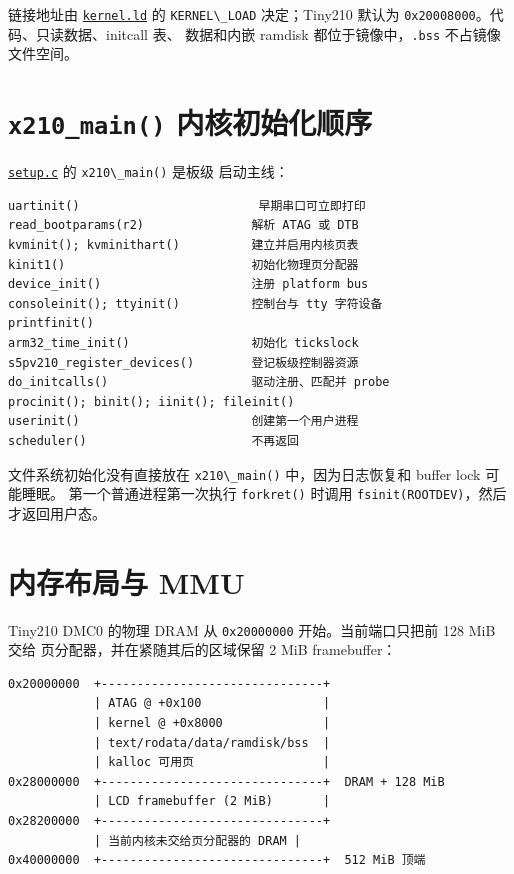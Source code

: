 链接地址由
\href{../../../kernel/arch/arm/mach-s5pv210/kernel.ld}{\passthrough{\lstinline!kernel.ld!}}
的 \passthrough{\lstinline!KERNEL\_LOAD!} 决定；Tiny210 默认为
\passthrough{\lstinline!0x20008000!}。代码、只读数据、initcall 表、
数据和内嵌 ramdisk 都位于镜像中，\passthrough{\lstinline!.bss!}
不占镜像文件空间。

\section{\texorpdfstring{\texttt{x210\_main()}
内核初始化顺序}{x210\_main() 内核初始化顺序}}\label{x210_main-ux5185ux6838ux521dux59cbux5316ux987aux5e8f}

\href{../../../kernel/arch/arm/mach-s5pv210/setup.c}{\passthrough{\lstinline!setup.c!}}
的 \passthrough{\lstinline!x210\_main()!} 是板级 启动主线：

\begin{lstlisting}
uartinit()                         早期串口可立即打印
read_bootparams(r2)               解析 ATAG 或 DTB
kvminit(); kvminithart()          建立并启用内核页表
kinit1()                          初始化物理页分配器
device_init()                     注册 platform bus
consoleinit(); ttyinit()          控制台与 tty 字符设备
printfinit()
arm32_time_init()                 初始化 tickslock
s5pv210_register_devices()        登记板级控制器资源
do_initcalls()                    驱动注册、匹配并 probe
procinit(); binit(); iinit(); fileinit()
userinit()                        创建第一个用户进程
scheduler()                       不再返回
\end{lstlisting}

文件系统初始化没有直接放在 \passthrough{\lstinline!x210\_main()!}
中，因为日志恢复和 buffer lock 可能睡眠。 第一个普通进程第一次执行
\passthrough{\lstinline!forkret()!} 时调用
\passthrough{\lstinline!fsinit(ROOTDEV)!}，然后才返回用户态。

\section{内存布局与 MMU}\label{ux5185ux5b58ux5e03ux5c40ux4e0e-mmu}

Tiny210 DMC0 的物理 DRAM 从 \passthrough{\lstinline!0x20000000!}
开始。当前端口只把前 128 MiB 交给 页分配器，并在紧随其后的区域保留 2 MiB
framebuffer：

\begin{lstlisting}
0x20000000  +-------------------------------+
            | ATAG @ +0x100                 |
            | kernel @ +0x8000              |
            | text/rodata/data/ramdisk/bss  |
            | kalloc 可用页                  |
0x28000000  +-------------------------------+  DRAM + 128 MiB
            | LCD framebuffer (2 MiB)       |
0x28200000  +-------------------------------+
            | 当前内核未交给页分配器的 DRAM |
0x40000000  +-------------------------------+  512 MiB 顶端
\end{lstlisting}

